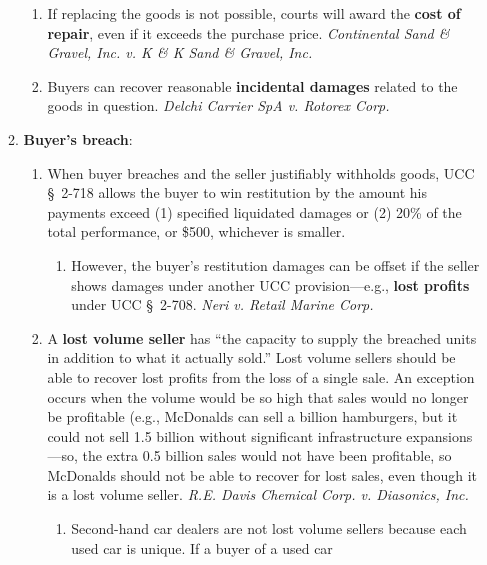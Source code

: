 \begin{enumerate}
\begin{enumerate}
\begin{enumerate}
            \item If replacing the goods is not possible, courts will award 
            the \textbf{cost of repair}, even if it exceeds the purchase 
            price.  \emph{Continental Sand \& Gravel, Inc. v. K \& K Sand \& 
            Gravel, Inc.}
            \item Buyers can recover reasonable \textbf{incidental damages} 
            related to the goods in question. \emph{Delchi Carrier SpA v. 
            Rotorex Corp.}
        \end{enumerate}
        \item \textbf{Buyer's breach}:
        \begin{enumerate}
            \item When buyer breaches and the seller justifiably withholds 
            goods, UCC \S\ 2-718 allows the buyer to win restitution by the 
            amount his payments exceed (1) specified liquidated damages or (2) 
            20\% of the total performance, or \$500, whichever is smaller.
            \begin{enumerate}
                \item However, the buyer's restitution damages can be offset 
                if the seller shows damages under another UCC 
                provision---e.g., \textbf{lost profits} under UCC \S\ 2-708. 
                \emph{Neri v. Retail Marine Corp.}
            \end{enumerate}
            \item A \textbf{lost volume seller} has ``the capacity to supply 
            the breached units in addition to what it actually sold.'' Lost 
            volume sellers should be able to recover lost profits from the 
            loss of a single sale. An exception occurs when the volume would 
            be so high that sales would no longer be profitable (e.g., 
            McDonalds can sell a billion hamburgers, but it could not sell 1.5 
            billion without significant infrastructure expansions---so, the 
            extra 0.5 billion sales would not have been profitable, so 
            McDonalds should not be able to recover for lost sales, even 
            though it is a lost volume seller. \emph{R.E. Davis Chemical Corp. 
            v. Diasonics, Inc.}
            \begin{enumerate}
                \item Second-hand car dealers are not lost volume sellers 
                because each used car is unique. If a buyer of a used car 

\end{enumerate}
\end{enumerate}
\end{enumerate}
\end{enumerate}
